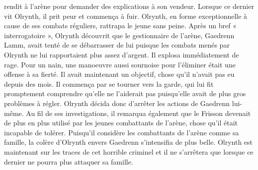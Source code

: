 \documentclass[main.tex]{subfiles}
\begin{document}
    rendit à l'arène pour demander des explications à son vendeur. Lorsque ce dernier vit Olrynth, il prit peur
    et commença à fuir. Olrynth, en forme exceptionnelle à cause de ses combats réguliers, rattrapa le jeune
    sans peine. Après un bref « interrogatoire », Olrynth découvrit que le gestionnaire de l'arène, Gaedrenn Lamm,
    avait tenté de se débarrasser de lui puisque les combats menés par Olrynth ne lui rapportaient plus assez
    d'argent. Il explosa immédiatement de rage. Pour un nain, une manoeuvre aussi sournoise pour l'éliminer
    était une offense à sa fierté. Il avait maintenant un objectif, chose qu'il n'avait pas eu depuis des
    mois. Il commença par se tourner vers la garde, qui lui fit promptement comprendre qu'elle ne l'aiderait pas
    puisqu'elle avait de plus gros problèmes à régler. Olrynth décida donc d'arrêter les actions de Gaedrenn
    lui-même. Au fil de ses investigations, il remarqua également que le Frisson devenait de plus en plus 
    utilisé par les jeunes combattants de l'arène, chose qu'il était incapable de tolérer. Puisqu'il considère 
    les combattants de l'arène comme sa famille, la colère d'Olrynth envers Gaedrenn s'intensifia de plus 
    belle. Olrynth est maintenant sur les traces de cet horrible criminel et il ne s'arrêtera que lorsque 
    ce dernier ne pourra plus attaquer sa famille.
\end{document}
